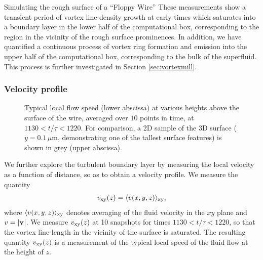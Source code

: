 \begin{chapter}{\label{cha:afm}Simulating the rough surface of a ``Floppy Wire''}
These measurements show a transient period of vortex line-density growth at early times which saturates into a boundary layer in the lower half of the computational box, corresponding to the region in the vicinity of the rough surface prominences. In addition, we have quantified a continuous process of vortex ring formation and emission into the upper half of the computational box, corresponding to the bulk of the superfluid. This process is further investigated in Section \ref{sec:vortexmill}.

\subsubsection{Velocity profile}
\begin{figure}
  \centering
  \caption{Typical local flow speed (lower abscissa) at various heights above the surface of the wire, averaged over $10$ points in time, at $1130<t/\tau<1220$. For comparison, a 2D sample of the 3D surface ($y=0.1\,\mu$m, demonstrating one of the tallest surface features) is shown in grey (upper abscissa).} 
  \end{figure}
We further explore the turbulent boundary layer by measuring the local velocity as a function of distance, so as to obtain a velocity profile. We measure the quantity 
\begin{equation}
  v_{\rm xy}(z) = \langle v(x,y,z) \rangle_{\rm xy},
\end{equation}
where $\langle v(x,y,z) \rangle_{\rm xy}$ denotes averaging of the fluid velocity in the $xy$ plane and $v=|\bf {v}$|. We measure $v_{\rm xy}(z)$ at 10 snapshots for times $1130<t/\tau<1220$, so that the vortex line-length in the vicinity of the surface is saturated. The resulting quantity $v_{\rm xy}(z)$ is a measurement of the typical local speed of the fluid flow at the height of $z$.


\end{chapter}
